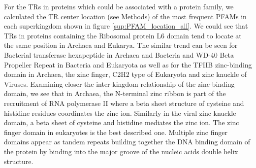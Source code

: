 \documentclass[a4,center,fleqn]{NAR}
\begin{document}
For the TRs in proteins which could be associated with a protein family, we calculated the TR center location (see Methods) of the most frequent PFAMs in each superkingdom shown in figure \ref{sup:PFAM_location_all}.
We could see that TRs in proteins containing the Ribosomal protein L6 domain tend to locate at the same position in Archaea and Eukarya. The similar trend can be seen for Bacterial transferase hexapeptide in Archaea and Bacteria and WD-40 Beta Propeller Repeat in Bacteria and Eukaryota as well as for the TFIIB zinc-binding domain in Archaea, the zinc finger, C2H2 type of Eukaryota and zinc knuckle of Viruses.
Examining closer the inter-kingdom relationship of the zinc-binding domain, we see that in Archaea, the N-terminal zinc ribbon is part of the recruitment of RNA polymerase II where a beta sheet structure of cysteine and histidine residues coordinates the zinc ion.
Similarly in the viral zinc knuckle domain, a beta sheet of cysteine and histidine mediates the zinc ion. 
The zinc finger domain in eukaryotes is the best described one. Multiple zinc finger domains appear as tandem repeats building together the DNA binding domain of the protein by binding into the major groove of the nucleic acids double helix structure. 
\end{document}

